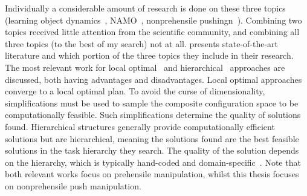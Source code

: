 Individually a considerable amount of research is done on these three topics (learning object dynamics~\cite{cong_selfadapting_2020,seegmiller_vehicle_2013}, \ac{NAMO}~\cite{chen_fast_2018,elbanhawi_samplingbased_2014,ellis_navigation_2022,kingston_samplingbased_2018,lavalle_planning_2006,wang_affordancebased_2020}, nonprehensile pushingn~\cite{arruda_uncertainty_2017,bauza_dataefficient_2018,mericli_pushmanipulation_2015,stuber_featurebased_2018,stuber_let_2020,toussaint_sequenceofconstraints_2022}). Combining two topics received little attention from the scientific community, and combining all three topics (to the best of my search) not at all.  presents state-of-the-art literature and which portion of the three topics they include in their research. The most relevant work for local optimal~\cite{sabbaghnovin_model_2021} and hierarchical~\cite{scholz_navigation_2016} approaches are discussed, both having advantages and disadvantages. Local optimal approaches converge to a local optimal plan. To avoid the curse of dimensionality, simplifications must be used to sample the composite configuration space to be computationally feasible. Such simplifications determine the quality of solutions found. Hierarchical structures generally provide computationally efficient solutions but are hierarchical, meaning the solutions found are the best feasible solutions in the task hierarchy they search. The quality of the solution depends on the hierarchy, which is typically hand-coded and domain-specific~\cite{vega-brown_asymptotically_2020}. Note that both relevant works focus on prehensile manipulation, whilst this thesis focuses on nonprehensile push manipulation.\bs

